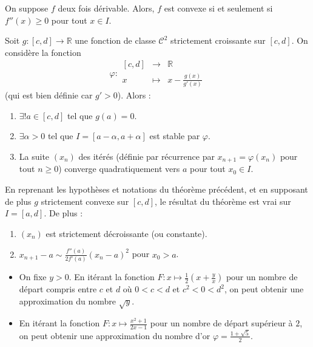   \begin{proposition}
    On suppose $f$ deux fois dérivable. Alors, $f$ est convexe si et seulement si $f''(x) \geq 0$ pour tout $x \in I$.
  \end{proposition}


  \begin{application}
    Soit $g : [c, d] \rightarrow \mathbb{R}$ une fonction de classe $\mathcal{C}^2$ strictement croissante sur $[c, d]$. On considère la fonction
    \[ \varphi :
    \begin{array}{ccc}
      [c, d] &\rightarrow& \mathbb{R} \\
      x &\mapsto& x - \frac{g(x)}{g'(x)}
    \end{array}
    \]
    (qui est bien définie car $g' > 0$). Alors :
    \begin{enumerate}[label={\bfseries(\roman*)}]
      \item $\exists! a \in [c, d]$ tel que $g(a) = 0$.
      \item $\exists \alpha > 0$ tel que $I = [a - \alpha, a + \alpha]$ est stable par $\varphi$.
      \item La suite $(x_n)$ des itérés (définie par récurrence par $x_{n+1} = \varphi(x_n)$ pour tout $n \geq 0$) converge quadratiquement vers $a$ pour tout $x_0 \in I$.
    \end{enumerate}
  \end{application}

  \begin{corollary}
    En reprenant les hypothèses et notations du théorème précédent, et en supposant de plus $g$ strictement convexe sur $[c, d]$, le résultat du théorème est vrai sur $I = [a, d]$. De plus :
    \begin{enumerate}[label={\bfseries(\roman*)}]
      \item $(x_n)$ est strictement décroissante (ou constante).
      \item $x_{n+1} - a \sim \frac{f''(a)}{2f'(a)} (x_n - a)^2$ pour $x_0 > a$.
    \end{enumerate}
  \end{corollary}

  \begin{example}
    \begin{itemize}
      \item On fixe $y > 0$. En itérant la fonction $F : x \mapsto \frac{1}{2} \left( x + \frac{y}{x} \right)$ pour un nombre de départ compris entre $c$ et $d$ où $0 < c < d$ et $c^2 < 0 < d^2$, on peut obtenir une approximation du nombre $\sqrt{y}$.
      \item En itérant la fonction $F : x \mapsto \frac{x^2+1}{2x-1}$ pour un nombre de départ supérieur à $2$, on peut obtenir une approximation du nombre d'or $\varphi = \frac{1+\sqrt{5}}{2}$.
    \end{itemize}
  \end{example}


